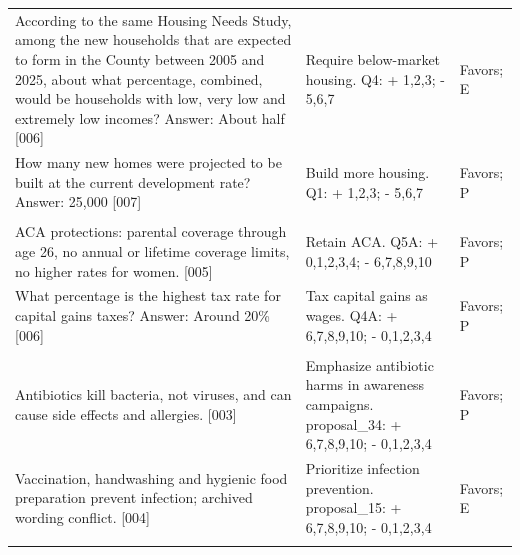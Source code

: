 \begin{longtable}{>{\raggedright\arraybackslash}p{8cm}>{\raggedright\arraybackslash}p{4cm}>{\raggedright\arraybackslash}p{2cm}}
According to the same Housing Needs Study, among the new households that are expected to form in the County between 2005 and 2025, about what percentage, combined, would be households with low, very low and extremely low incomes? Answer: About half [006] & Require below-market housing. Q4: + 1,2,3; - 5,6,7 & Favors; E \\
How many new homes were projected to be built at the current development rate? Answer: 25,000 [007] & Build more housing. Q1: + 1,2,3; - 5,6,7 & Favors; P \\
\addlinespace
\multicolumn{3}{l}{\textbf{US: America in One Room (2019)}} \\*
ACA protections: parental coverage through age 26, no annual or lifetime coverage limits, no higher rates for women. [005] & Retain ACA. Q5A: + 0,1,2,3,4; - 6,7,8,9,10 & Favors; P \\
What percentage is the highest tax rate for capital gains taxes? Answer: Around 20\% [006] & Tax capital gains as wages. Q4A: + 6,7,8,9,10; - 0,1,2,3,4 & Favors; P \\
\addlinespace
\multicolumn{3}{l}{\textbf{Multinational: antibiotics (2024)}} \\*
Antibiotics kill bacteria, not viruses, and can cause side effects and allergies. [003] & Emphasize antibiotic harms in awareness campaigns. proposal\_34: + 6,7,8,9,10; - 0,1,2,3,4 & Favors; P \\
Vaccination, handwashing and hygienic food preparation prevent infection; archived wording conflict. [004] & Prioritize infection prevention. proposal\_15: + 6,7,8,9,10; - 0,1,2,3,4 & Favors; E \\
\addlinespace
\bottomrule
\end{longtable}
